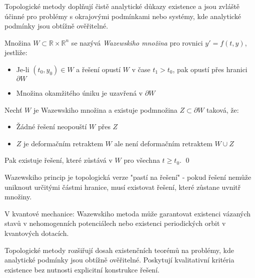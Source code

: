 \begin{motivation}
Topologické metody doplňují čistě analytické důkazy existence a jsou zvláště účinné pro problémy s okrajovými podmínkami nebo systémy, kde analytické podmínky jsou obtížně ověřitelné.
\end{motivation}

\begin{definition}
Množina $W \subset \mathbb{R} \times \mathbb{R}^n$ se nazývá \emph{Wazewskiho množina} pro rovnici $y' = f(t,y)$, jestliže:
\begin{itemize}
\item Je-li $(t_0, y_0) \in W$ a řešení opustí $W$ v čase $t_1 > t_0$, pak opustí přes hranici $\partial W$
\item Množina okamžitého úniku je uzavřená v $\partial W$
\end{itemize}
\end{definition}

\begin{theorem}
Nechť $W$ je Wazewskiho množina a existuje podmnožina $Z \subset \partial W$ taková, že:
\begin{itemize}
\item Žádné řešení neopouští $W$ přes $Z$
\item $Z$ je deformačním retraktem $W$ ale není deformačním retraktem $W \cup Z$
\end{itemize}
Pak existuje řešení, které zůstává v $W$ pro všechna $t \geq t_0$.
\qed
\end{theorem}

\begin{intuition}
Wazewskiho princip je topologická verze "pastí na řešení" - pokud řešení nemůže uniknout určitými částmi hranice, musí existovat řešení, které zůstane uvnitř množiny.
\end{intuition}

\begin{application}
V kvantové mechanice: Wazewskiho metoda může garantovat existenci vázaných stavů v nehomogenních potenciálech nebo existenci periodických orbit v kvantových dotacích.
\end{application}

\begin{keyinsight}
Topologické metody rozšiřují dosah existenčních teorémů na problémy, kde analytické podmínky jsou obtížně ověřitelné. Poskytují kvalitativní kritéria existence bez nutnosti explicitní konstrukce řešení.
\end{keyinsight}

